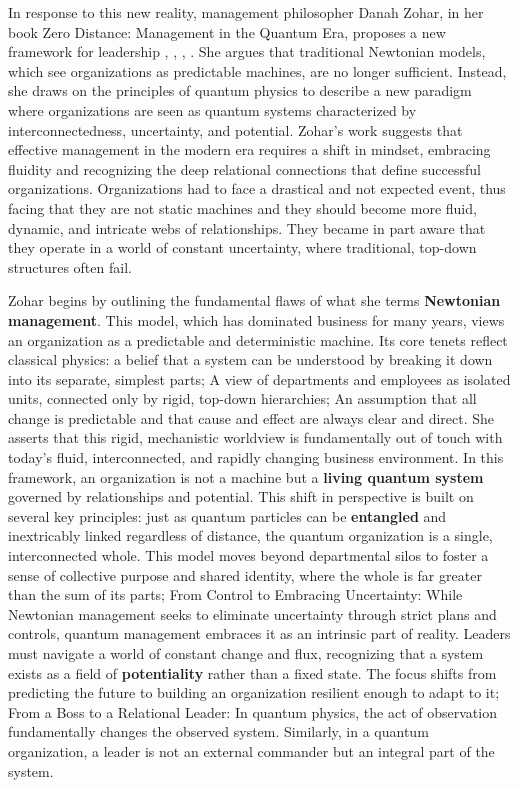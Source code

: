 \documentclass{article}
\begin{document}
In response to this new reality, management philosopher Danah Zohar, in her book Zero Distance: Management in the Quantum Era, proposes a new framework for leadership \cite{zohar2021zerodistance}, \cite{zohar1990quantum}, \cite{zohar2000quantumleader}, \cite{zohar2004spiritual}. She argues that traditional Newtonian models, which see organizations as predictable machines, are no longer sufficient. Instead, she draws on the principles of quantum physics to describe a new paradigm where organizations are seen as quantum systems characterized by interconnectedness, uncertainty, and potential. Zohar's work suggests that effective management in the modern era requires a shift in mindset, embracing fluidity and recognizing the deep relational connections that define successful organizations.
Organizations had to face a drastical and not expected event, thus facing that they are not static machines and they should become more fluid, dynamic, and intricate webs of relationships. They became in part aware that they operate in a world of constant uncertainty, where traditional, top-down structures often fail.

Zohar begins by outlining the fundamental flaws of what she terms \textbf{Newtonian management}. This model, which has dominated business for many years, views an organization as a predictable and deterministic machine. Its core tenets reflect classical physics: a belief that a system can be understood by breaking it down into its separate, simplest parts; A view of departments and employees as isolated units, connected only by rigid, top-down hierarchies; An assumption that all change is predictable and that cause and effect are always clear and direct. She asserts that this rigid, mechanistic worldview is fundamentally out of touch with today's fluid, interconnected, and rapidly changing business environment. In this framework, an organization is not a machine but a \textbf{living quantum system} governed by relationships and potential. This shift in perspective is built on several key principles: just as quantum particles can be \textbf{entangled} and inextricably linked regardless of distance, the quantum organization is a single, interconnected whole. This model moves beyond departmental silos to foster a sense of collective purpose and shared identity, where the whole is far greater than the sum of its parts; From Control to Embracing Uncertainty: While Newtonian management seeks to eliminate uncertainty through strict plans and controls, quantum management embraces it as an intrinsic part of reality. Leaders must navigate a world of constant change and flux, recognizing that a system exists as a field of \textbf{potentiality} rather than a fixed state. The focus shifts from predicting the future to building an organization resilient enough to adapt to it; From a Boss to a Relational Leader: In quantum physics, the act of observation fundamentally changes the observed system. Similarly, in a quantum organization, a leader is not an external commander but an integral part of the system. 
\end{document}
